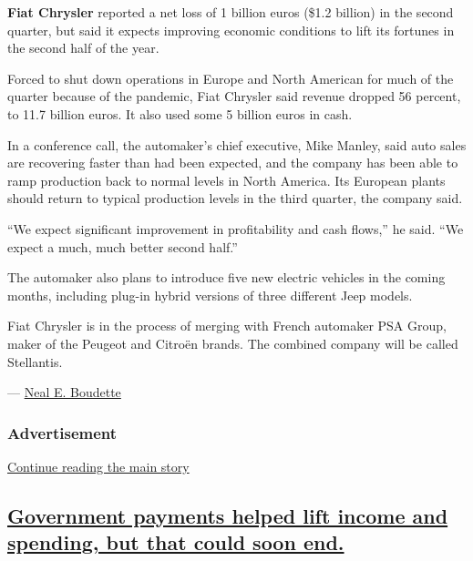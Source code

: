 \textbf{Fiat Chrysler} reported a net loss of 1 billion euros (\$1.2
billion) in the second quarter, but said it expects improving economic
conditions to lift its fortunes in the second half of the year.

Forced to shut down operations in Europe and North American for much of
the quarter because of the pandemic, Fiat Chrysler said revenue dropped
56 percent, to 11.7 billion euros. It also used some 5 billion euros in
cash.

In a conference call, the automaker's chief executive, Mike Manley, said
auto sales are recovering faster than had been expected, and the company
has been able to ramp production back to normal levels in North America.
Its European plants should return to typical production levels in the
third quarter, the company said.

``We expect significant improvement in profitability and cash flows,''
he said. ``We expect a much, much better second half.''

The automaker also plans to introduce five new electric vehicles in the
coming months, including plug-in hybrid versions of three different Jeep
models.

Fiat Chrysler is in the process of merging with French automaker PSA
Group, maker of the Peugeot and Citroën brands. The combined company
will be called Stellantis.

--- \href{https://www.nytimes.com/by/neal-e-boudette}{Neal E. Boudette}

\hypertarget{advertisement-2}{%
\subsubsection{Advertisement}\label{advertisement-2}}

\protect\hyperlink{after-dfp-ad-mid3}{Continue reading the main story}

\hypertarget{government-payments-helped-lift-income-and-spending-but-that-could-soon-end}{%
\subsection{\texorpdfstring{\protect\hyperlink{government-payments-helped-lift-income-and-spending-but-that-could-soon-end}{Government
payments helped lift income and spending, but that could soon
end.}}{Government payments helped lift income and spending, but that could soon end.}}\label{government-payments-helped-lift-income-and-spending-but-that-could-soon-end}}

